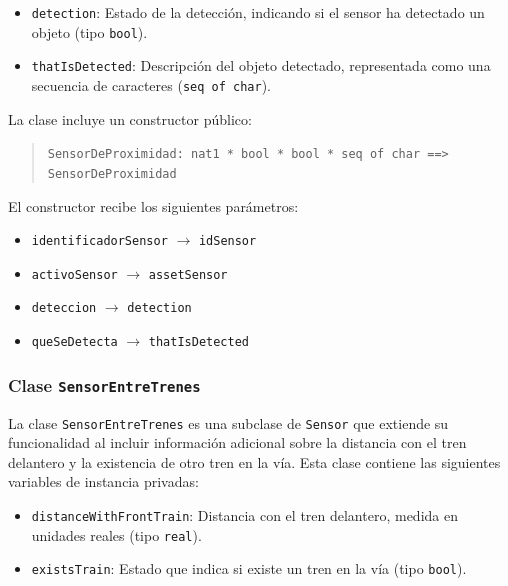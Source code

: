 \documentclass[journal]{IEEEtran}
\begin{document}
    \begin{itemize}
    \item \texttt{detection}: Estado de la detección, indicando si el sensor ha detectado un objeto (tipo \texttt{bool}).
    \item \texttt{thatIsDetected}: Descripción del objeto detectado, representada como una secuencia de caracteres (\texttt{seq of char}).
    \end{itemize}

    La clase incluye un constructor público:

    \begin{quote}
    \texttt{SensorDeProximidad: nat1 * bool * bool * seq of char \texttt{==>} SensorDeProximidad}
    \end{quote}

    El constructor recibe los siguientes parámetros:
    \begin{itemize}
    \item \texttt{identificadorSensor} $\rightarrow$ \texttt{idSensor}
    \item \texttt{activoSensor} $\rightarrow$ \texttt{assetSensor}
    \item \texttt{deteccion} $\rightarrow$ \texttt{detection}
    \item \texttt{queSeDetecta} $\rightarrow$ \texttt{thatIsDetected}
    \end{itemize}




    \subsubsection*{Clase \texttt{SensorEntreTrenes}}

    La clase \texttt{SensorEntreTrenes} es una subclase de \texttt{Sensor} que extiende su funcionalidad al incluir información adicional sobre la distancia con el tren delantero y la existencia de otro tren en la vía. Esta clase contiene las siguientes variables de instancia privadas:

    \begin{itemize}
    \item \texttt{distanceWithFrontTrain}: Distancia con el tren delantero, medida en unidades reales (tipo \texttt{real}).
    \item \texttt{existsTrain}: Estado que indica si existe un tren en la vía (tipo \texttt{bool}).
    \end{itemize}
\end{document}

